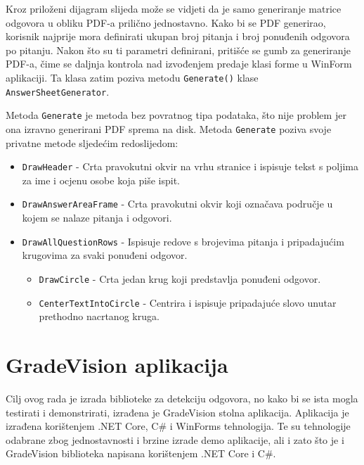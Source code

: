 \documentclass{foi}
\begin{document}
Kroz priloženi dijagram slijeda može se vidjeti da je samo generiranje matrice odgovora u obliku PDF-a prilično jednostavno. Kako bi se PDF generirao, korisnik najprije mora definirati ukupan broj pitanja i broj ponuđenih odgovora po pitanju. Nakon što su ti parametri definirani, pritišće se gumb za generiranje PDF-a, čime se daljnja kontrola nad izvođenjem predaje klasi forme u WinForm aplikaciji. Ta klasa zatim poziva metodu \texttt{Generate()} klase \texttt{AnswerSheetGenerator}. 

Metoda \texttt{Generate} je metoda bez povratnog tipa podataka, što nije problem jer ona izravno generirani PDF sprema na disk. Metoda \texttt{Generate} poziva svoje privatne metode sljedećim redoslijedom:

\begin{itemize}
\item \texttt{DrawHeader} - Crta pravokutni okvir na vrhu stranice i ispisuje tekst s poljima za ime i ocjenu osobe koja piše ispit.
\item \texttt{DrawAnswerAreaFrame} - Crta pravokutni okvir koji označava područje u kojem se nalaze pitanja i odgovori.
\item \texttt{DrawAllQuestionRows} - Ispisuje redove s brojevima pitanja i pripadajućim krugovima za svaki ponuđeni odgovor.
    \begin{itemize}
    \item \texttt{DrawCircle} - Crta jedan krug koji predstavlja ponuđeni odgovor.
    \item \texttt{CenterTextIntoCircle} - Centrira i ispisuje pripadajuće slovo unutar prethodno nacrtanog kruga.
    \end{itemize}
\end{itemize}


\section{GradeVision aplikacija}

Cilj ovog rada je izrada biblioteke za detekciju odgovora, no kako bi se ista mogla testirati i demonstrirati, izrađena je GradeVision stolna aplikacija. Aplikacija je izrađena korištenjem .NET Core, C\# i WinForms tehnologija. Te su tehnologije odabrane zbog jednostavnosti i brzine izrade demo aplikacije, ali i zato što je i GradeVision biblioteka napisana korištenjem .NET Core i C\#.
\end{document}
